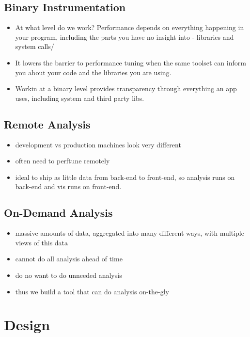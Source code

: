 \documentclass[annual]{acmsiggraph}
\begin{document}
  \subsection{Binary Instrumentation}
  \begin{itemize}
  \item At what level do we work? Performance depends on everything happening in your program, including the parts you have no insight into - libraries and system calls/
  \item It lowers the barrier to performance tuning when the same toolset can inform you about your code and the libraries you are using.
  \item Workin at a binary level provides transparency through everything an app uses, including system and third party libs.
  \end{itemize}

  \subsection{Remote Analysis}
  \begin{itemize}
    \item development vs production machines look very different
    \item often need to perftune remotely
    \item ideal to ship as little data from back-end to front-end, so analysis runs on back-end and vis runs on front-end.
  \end{itemize}

  \subsection{On-Demand Analysis}
  \begin{itemize}
    \item massive amounts of data, aggregated into many different ways, with multiple views of this data
    \item cannot do all analysis ahead of time
    \item do no want to do unneeded analysis
    \item thus we build a tool that can do analysis on-the-gly
  \end{itemize}
  

\section {Design}
\end{document}
